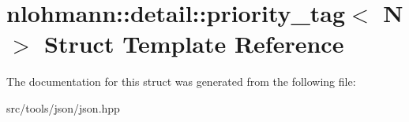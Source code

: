 \hypertarget{structnlohmann_1_1detail_1_1priority__tag}{}\section{nlohmann\+:\+:detail\+:\+:priority\+\_\+tag$<$ N $>$ Struct Template Reference}
\label{structnlohmann_1_1detail_1_1priority__tag}


The documentation for this struct was generated from the following file\+:\begin{DoxyCompactItemize}
\item 
src/tools/json/json.\+hpp\end{DoxyCompactItemize}
